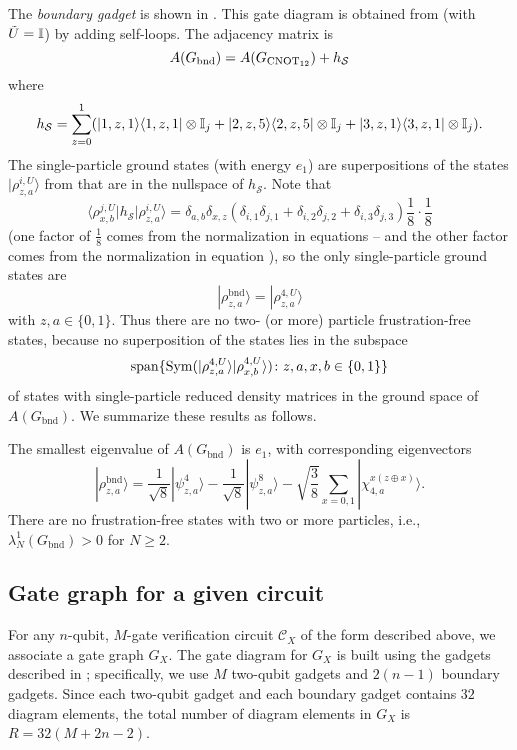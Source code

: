 \documentclass[../thesis-main/thesis-main]{subfiles}
\begin{document}
The \emph{boundary gadget} is shown in . This gate diagram is obtained from  (with $\tilde U=\mathbb{I}$) by adding self-loops. The adjacency matrix is
\[
  A(G_{\text{bnd}})=A(G_{\mathrm{CNOT}_{12}})+h_{\mathcal{S}}
\]
where 
\[
  h_{\mathcal{S}}
  =\sum_{z=0}^{1}(
    |1,z,1\rangle\langle1,z,1|\otimes\mathbb{I}_{j}
   +|2,z,5\rangle\langle2,z,5|\otimes\mathbb{I}_{j}
   +|3,z,1\rangle\langle3,z,1|\otimes\mathbb{I}_{j}
  ).
\]
The single-particle ground states (with energy $e_{1}$) are superpositions of the states $|\rho_{z,a}^{i,U}\rangle$ from  that are in the nullspace of $h_{\mathcal{S}}$. Note that 
\[
\langle\rho_{x,b}^{j,U}|h_{\mathcal{S}}|\rho_{z,a}^{i,U}\rangle=\delta_{a,b}\delta_{x,z}\left(\delta_{i,1}\delta_{j,1}+\delta_{i,2}\delta_{j,2}+\delta_{i,3}\delta_{j,3}\right)\frac{1}{8}\cdot\frac{1}{8}
\]
(one factor of $\frac{1}{8}$ comes from the normalization in equations -- and the other factor comes from the normalization in equation ), so the only single-particle ground states are 
\[
|\rho_{z,a}^{\text{bnd}}\rangle = |\rho_{z,a}^{4,U}\rangle
\]
with $z,a\in\{0,1\}$. Thus there are no two- (or more) particle frustration-free states, because no superposition of the states  lies in the subspace 
\[
\operatorname{span}\{ \operatorname{Sym}(|\rho_{z,a}^{4,U}\rangle|\rho_{x,b}^{4,U}\rangle)\colon z,a,x,b\in\{0,1\}\} 
\]
of states with single-particle reduced density matrices in the ground space of $A(G_{\text{bnd}})$.  We summarize these results as follows.

\begin{lemma}\label{lem:boundary_lemma}
The smallest eigenvalue of $A(G_{\text{bnd}})$ is $e_{1}$, with corresponding eigenvectors 
\begin{equation}
|\rho_{z,a}^{\text{bnd}}\rangle=\frac{1}{\sqrt{8}}|\psi_{z,a}^{4}\rangle-\frac{1}{\sqrt{8}}|\psi_{z,a}^{8}\rangle-\sqrt{\frac{3}{8}}\sum_{x=0,1}|\chi_{4,a}^{x\left(z\oplus x\right)}\rangle.\label{eq:rho_bnd}
\end{equation}
There are no frustration-free states with two or more particles, i.e., $\lambda_{N}^{1}(G_{\text{bnd}})>0$ for $N\geq2$.
\end{lemma}


\subsection{Gate graph for a given circuit}

For any $n$-qubit, $M$-gate verification circuit $\mathcal{C}_{X}$ of the form described above, we associate a gate graph $G_X$. The gate diagram for $G_X$ is built using the gadgets described in ; specifically, we use $M$ two-qubit gadgets and $2(n-1)$ boundary gadgets. Since each two-qubit gadget and each boundary gadget contains $32$ diagram elements, the total number of diagram elements in $G_X$ is $R=32(M+2n-2)$.
\end{document}
